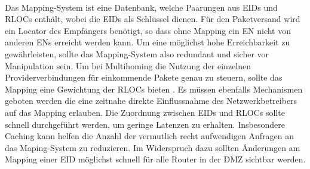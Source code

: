 \paragraph{}
Das Mapping-System ist eine Datenbank, welche Paarungen aus EIDs und RLOCs enthält, wobei die EIDs als Schlüssel dienen. Für den Paketversand wird ein Locator des Empfängers benötigt, so dass ohne Mapping ein EN nicht von anderen ENs erreicht werden kann. Um eine möglichst hohe Erreichbarkeit zu gewährleisten, sollte das Mapping-System also redundant und sicher vor Manipulation sein. Um bei Multihoming die Nutzung der einzelnen Providerverbindungen für einkommende Pakete genau zu steuern, sollte das Mapping eine Gewichtung der RLOCs bieten \cite{mathy:2008:dht}. Es müssen ebenfalls Mechanismen geboten werden die eine zeitnahe direkte Einflussnahme des Netzwerkbetreibers auf das Mapping erlauben. Die Zuordnung zwischen EIDs und RLOCs sollte schnell durchgeführt werden, um geringe Latenzen zu erhalten. Insbesondere Caching kann helfen die Anzahl der vermutlich recht aufwendigen Anfragen an das Maping-System zu reduzieren. Im Widerspruch dazu sollten Änderungen am Mapping einer EID möglichst schnell für alle Router in der DMZ sichtbar werden. 

